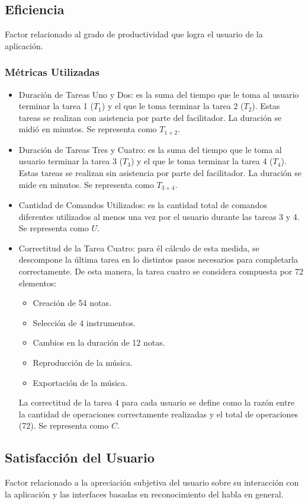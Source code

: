 \subsection{Eficiencia}
Factor relacionado al grado de productividad que logra el usuario de la aplicaci\'on.
\subsubsection{M\'etricas Utilizadas}
\begin{itemize}
	\item Duraci\'on de Tareas Uno y Dos: es la suma del tiempo que le toma al usuario
	terminar la tarea 1 ($T_1$) y el que le toma terminar la tarea 2 ($T_2$). 
	Estas tareas se realizan con asistencia por parte del facilitador. 
	La duraci\'on se midi\'o en minutos. Se representa como $T_{1+2}$.
	\item Duraci\'on de Tareas Tres y Cuatro: es la suma del tiempo que le toma al usuario
	terminar la tarea 3 ($T_3$) y el que le toma terminar la tarea 4 ($T_4$). 
	Estas tareas se realizan sin asistencia por parte del facilitador. 
	La duraci\'on se mide en minutos. Se representa como $T_{3+4}$.
	\item Cantidad de Comandos Utilizados: es la cantidad total de comandos diferentes utilizados
	al menos una vez por el usuario durante las tareas 3 y 4. Se representa como $U$.
	\item Correctitud de la Tarea Cuatro: para \'el c\'alculo de esta medida, se descompone la
	\'ultima tarea en lo distintos pasos necesarios para completarla correctamente.
	De esta manera, la tarea cuatro se considera compuesta por 72 elementos:
	\begin{itemize}
		\item Creaci\'on de 54 notas.
		\item Selecci\'on de 4 instrumentos.
		\item Cambios en la duraci\'on de 12 notas.
		\item Reproducci\'on de la m\'usica.
		\item Exportaci\'on de la m\'usica.
	\end{itemize}
	La correctitud de la tarea 4 para cada usuario se define como la raz\'on entre la cantidad de operaciones
	correctamente realizadas y el total de operaciones (72). Se representa como $C$.
\end{itemize}

\subsection{Satisfacci\'on del Usuario}
Factor relacionado a la apreciaci\'on subjetiva del usuario sobre su interacci\'on con la aplicaci\'on y
las interfaces basadas en reconocimiento del habla en general.
